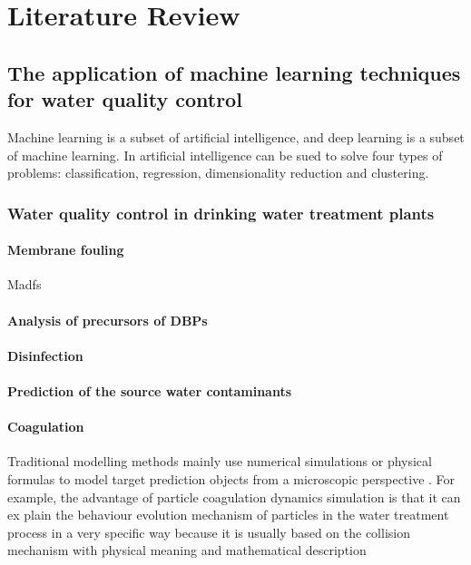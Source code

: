 \chapter{Literature Review}

\section{The application of machine learning techniques for water quality control}
Machine learning is a subset of artificial intelligence, and deep learning is a subset 
of machine learning. In artificial intelligence can be sued to solve four types of problems: 
classification, regression, dimensionality reduction and clustering. 
\subsection{Water quality control in drinking water treatment plants}
\subsubsection{Membrane fouling}
Madfs
\subsubsection{Analysis of precursors of DBPs}

\subsubsection{Disinfection}
\subsubsection{Prediction of the source water contaminants}
\subsubsection{Coagulation}
Traditional modelling methods 
mainly use numerical simulations or physical formulas to model target prediction objects from 
a microscopic perspective . For example, the advantage of particle coagulation dynamics 
simulation is that it can ex    plain the behaviour evolution mechanism of particles in the water 
treatment process in a very specific way because it is usually based on the collision mechanism 
with physical meaning and mathematical description

